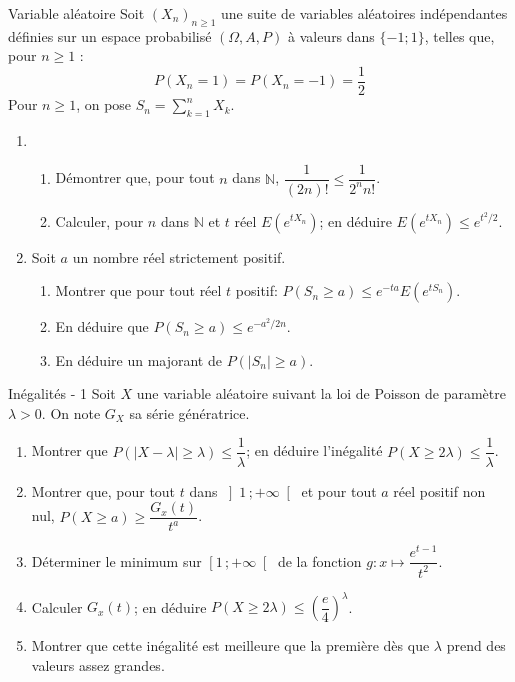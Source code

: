 \documentclass[french, a4paper, 11pt]{article}
\newcommand{\N}{\mathbb{N}}   %
\newcommand{\po}{\left(}         %
\newcommand{\pf}{\right)}        %
\newcommand{\pof}[1]{\po #1 \pf} %
\newcommand{\interoo}[2]{\left]#1\,;#2\right[}   %
\newcommand{\interfo}[2]{\left[#1\,;#2\right[}   %
\begin{document}
\begin{cadre}{Variable aléatoire}
  Soit \(\pof{X_{n}}_{n\geqslant 1}\) une suite de variables aléatoires indépendantes définies sur un espace probabilisé \(\pof{\Omega, A, P}\) à valeurs dans \(\lbrace -1;1\rbrace\), telles que, pour \(n\geqslant 1\) :
  \[P\pof{X_{n} = 1} = P\pof{X_{n} = -1} = \dfrac{1}{2}\]
  Pour \(n\geqslant 1\), on pose \(S_{n} = \sum_{k=1}^{n} X_{k}\).
  \begin{enumerate}
      \item
      \begin{enumerate}
        \item Démontrer que, pour tout \(n\) dans \(\N\), \(\dfrac{1}{(2n)!}\leqslant\dfrac{1}{2^{n}n!}\).
        \item Calculer, pour \(n\) dans \(\N\) et \(t\) réel \(E\pof{e^{tX_{n}}}\); en déduire \(E(e^{tX_{n}}) \leqslant e^{t^{2}/2}\).
      \end{enumerate}
    \item Soit \(a\) un nombre réel strictement positif.
      \begin{enumerate}
        \item Montrer que pour tout réel \(t\) positif: \(P(S_{n}\geqslant a) \leqslant e^{-ta}E(e^{tS_{n}})\).
        \item En déduire que \(P(S_{n}\geqslant a)\leqslant e^{-a^{2}/2n}\).
        \item En déduire un majorant de \(P(\lvert S_{n}\rvert \geqslant a)\).
      \end{enumerate}
  \end{enumerate}
\end{cadre}

\begin{cadre}{Inégalités - 1}
  Soit $X$ une variable aléatoire suivant la loi de Poisson de paramètre $\lambda >0$. On note $G_{X}$ sa série génératrice.
  \begin{enumerate}
    \item Montrer que $P\pof{\lvert X-\lambda\rvert \geqslant \lambda}\leqslant \dfrac{1}{\lambda}$; en déduire l'inégalité $P(X\geqslant 2\lambda) \leqslant \dfrac{1}{\lambda}$.
    \item Montrer que, pour tout $t$ dans $\interoo{1}{+\infty}$ et pour tout $a$ réel positif non nul, $P(X\geqslant a)\geqslant \dfrac{G_{x}(t)}{t^{a}}$.
    \item Déterminer le minimum sur $\interfo{1}{+\infty}$ de la fonction $g:x\mapsto\dfrac{e^{t-1}}{t^{2}}$.
    \item Calculer $G_{x}(t)$; en déduire $P(X\geqslant 2\lambda)\leqslant\pof{\dfrac{e}{4}}^{\lambda}$.
    \item Montrer que cette inégalité est meilleure que la première dès que $\lambda$ prend des valeurs assez grandes.
  \end{enumerate}
\end{cadre}
\end{document}
